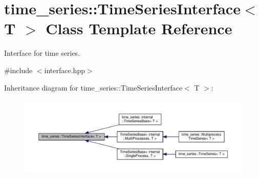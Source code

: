 \hypertarget{classtime__series_1_1TimeSeriesInterface}{}\section{time\+\_\+series\+:\+:Time\+Series\+Interface$<$ T $>$ Class Template Reference}
\label{classtime__series_1_1TimeSeriesInterface}


Interface for time series.  




{\ttfamily \#include $<$interface.\+hpp$>$}



Inheritance diagram for time\+\_\+series\+:\+:Time\+Series\+Interface$<$ T $>$\+:
\nopagebreak
\begin{figure}[H]
\begin{center}
\leavevmode
\includegraphics[width=350pt]{classtime__series_1_1TimeSeriesInterface__inherit__graph}
\end{center}
\end{figure}

